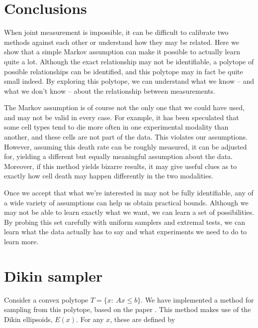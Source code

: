 \section{Conclusions}

When joint measurement is impossible, it can be difficult to calibrate two methods against each other or understand how they may be related.  Here we show that a simple Markov assumption can make it possible to actually learn quite a lot.  Although the exact relationship may not be identifiable, a polytope of possible relationships can be identified, and this polytope may in fact be quite small indeed.  By exploring this polytope, we can understand what we know -- and what we don't know -- about the relationship between measurements.

The Markov assumption is of course not the only one that we could have used, and may not be valid in every case.  For example, it has been speculated that some cell types tend to die more often in one experimental modality than another, and these cells are not part of the data.  This violates our assumptions.  However, assuming this death rate can be roughly measured, it can be adjusted for, yielding a different but equally meaningful assumption about the data.  Moreover, if this method yields bizarre results, it may give useful clues as to exactly how cell death may happen differently in the two modalities.

Once we accept that what we're interested in may not be fully identifiable, any of a wide variety of assumptions can help us obtain practical bounds.  Although we may not be able to learn exactly what we want, we can learn a set of possibilities.  By probing this set carefully with uniform samplers and extremal tests, we can learn what the data actually has to say and what experiments we need to do to learn more.  




\appendix

\section{Dikin sampler}

\label{sec:dikin}

Consider a convex polytope $T=\{x:\ Ax\leq b\}$.  We have implemented a method for sampling from this polytope, based on the paper \citep{kannan2012random}.  This method makes use of the Dikin ellipsoids, $E(x)$.  For any $x$, these are defined by 

